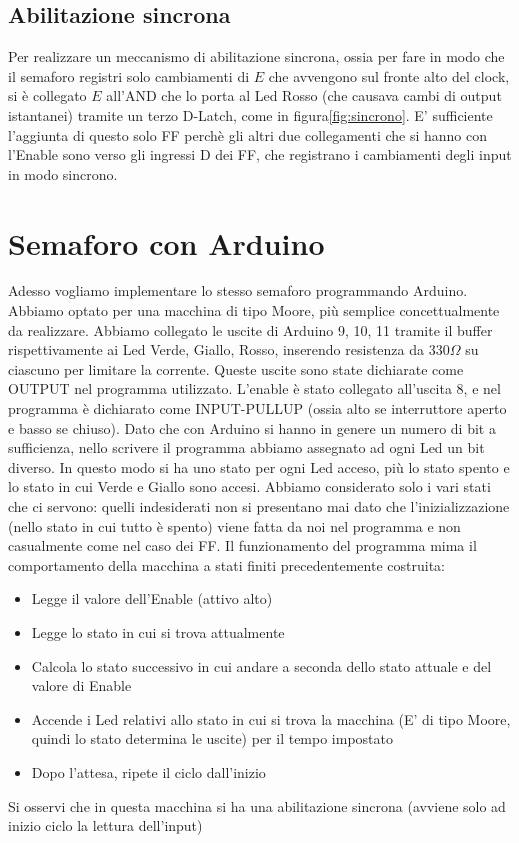 \documentclass[10pt,a4paper]{article}
\begin{document}
\subsection{Abilitazione sincrona}
Per realizzare un meccanismo di abilitazione sincrona, ossia per fare in modo che il semaforo registri solo cambiamenti di $E$ che avvengono sul fronte alto del clock, si è collegato $E$ all'AND che lo porta al Led Rosso (che causava cambi di output istantanei) tramite un terzo D-Latch, come in figura\ref{fig:sincrono}.
E' sufficiente l'aggiunta di questo solo FF perchè gli altri due collegamenti che si hanno con l'Enable sono verso gli ingressi D dei FF, che registrano i cambiamenti degli input in modo sincrono.
\section{Semaforo con Arduino}
Adesso vogliamo implementare lo stesso semaforo programmando Arduino. Abbiamo optato per una macchina di tipo Moore, più semplice concettualmente da realizzare.
Abbiamo collegato le uscite di Arduino 9, 10, 11 tramite il buffer rispettivamente ai Led Verde, Giallo, Rosso, inserendo resistenza da $330\Omega$ su ciascuno per limitare la corrente.
Queste uscite sono state dichiarate come OUTPUT nel programma utilizzato.
L'enable è stato collegato all'uscita 8, e nel programma è dichiarato come INPUT-PULLUP (ossia alto se interruttore aperto e basso se chiuso).
Dato che con Arduino si hanno in genere un numero di bit a sufficienza, nello scrivere il programma abbiamo assegnato ad ogni Led un bit diverso. In questo modo si ha uno stato per ogni Led acceso, più lo stato spento e lo stato in cui Verde e Giallo sono accesi. Abbiamo considerato solo i vari stati che ci servono: quelli indesiderati non si presentano mai dato che l'inizializzazione (nello stato in cui tutto è spento) viene fatta da noi nel programma e non casualmente come nel caso dei FF.
Il funzionamento del programma mima il comportamento della macchina a stati finiti precedentemente costruita:
\begin{itemize}
\item Legge il valore dell'Enable (attivo alto)
\item Legge lo stato in cui si trova attualmente
\item Calcola lo stato successivo in cui andare a seconda dello stato attuale e del valore di Enable
\item Accende i Led relativi allo stato in cui si trova la macchina (E' di tipo Moore, quindi lo stato determina le uscite) per il tempo impostato
\item Dopo l'attesa, ripete il ciclo dall'inizio
\end{itemize}
Si osservi che in questa macchina si ha una abilitazione sincrona (avviene solo ad inizio ciclo la lettura dell'input)
\end{document}

